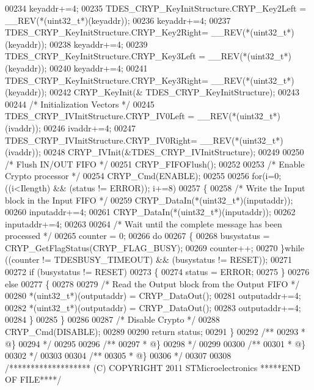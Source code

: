 \begin{DoxyCode}
00234   keyaddr+=4;
00235   TDES\_CRYP\_KeyInitStructure.CRYP\_Key2Left = \_\_REV(*(uint32\_t*)(keyaddr));
00236   keyaddr+=4;
00237   TDES\_CRYP\_KeyInitStructure.CRYP\_Key2Right= \_\_REV(*(uint32\_t*)(keyaddr));
00238   keyaddr+=4;
00239   TDES\_CRYP\_KeyInitStructure.CRYP\_Key3Left = \_\_REV(*(uint32\_t*)(keyaddr));
00240   keyaddr+=4;
00241   TDES\_CRYP\_KeyInitStructure.CRYP\_Key3Right= \_\_REV(*(uint32\_t*)(keyaddr));
00242   CRYP_KeyInit(& TDES\_CRYP\_KeyInitStructure);
00243 
00244   \textcolor{comment}{/* Initialization Vectors */}
00245   TDES\_CRYP\_IVInitStructure.CRYP\_IV0Left = \_\_REV(*(uint32\_t*)(ivaddr));
00246   ivaddr+=4;
00247   TDES\_CRYP\_IVInitStructure.CRYP\_IV0Right= \_\_REV(*(uint32\_t*)(ivaddr));
00248   CRYP_IVInit(&TDES\_CRYP\_IVInitStructure);
00249 
00250   \textcolor{comment}{/* Flush IN/OUT FIFO */}
00251   CRYP_FIFOFlush();
00252 
00253   \textcolor{comment}{/* Enable Crypto processor */}
00254   CRYP_Cmd(ENABLE);
00255 
00256   \textcolor{keywordflow}{for}(i=0; ((i<Ilength) && (status != ERROR)); i+=8)
00257   \{
00258     \textcolor{comment}{/* Write the Input block in the Input FIFO */}
00259     CRYP\_DataIn(*(uint32\_t*)(inputaddr));
00260     inputaddr+=4;
00261     CRYP\_DataIn(*(uint32\_t*)(inputaddr));
00262     inputaddr+=4;
00263 
00264     \textcolor{comment}{/* Wait until the complete message has been processed */}
00265     counter = 0;
00266     \textcolor{keywordflow}{do}
00267     \{
00268       busystatus = CRYP\_GetFlagStatus(CRYP_FLAG_BUSY);
00269       counter++;
00270     \}\textcolor{keywordflow}{while} ((counter != TDESBUSY_TIMEOUT) && (busystatus != RESET));
00271 
00272     \textcolor{keywordflow}{if} (busystatus != RESET)
00273    \{
00274        status = ERROR;
00275     \}
00276     \textcolor{keywordflow}{else}
00277     \{
00278 
00279       \textcolor{comment}{/* Read the Output block from the Output FIFO */}
00280       *(uint32\_t*)(outputaddr) = CRYP\_DataOut();
00281       outputaddr+=4;
00282       *(uint32\_t*)(outputaddr) = CRYP\_DataOut();
00283       outputaddr+=4;
00284     \}
00285   \}
00286 
00287   \textcolor{comment}{/* Disable Crypto */}
00288   CRYP_Cmd(DISABLE);
00289 
00290   \textcolor{keywordflow}{return} status;
00291 \}
00292 \textcolor{comment}{/**}
00293 \textcolor{comment}{  * @\}}
00294 \textcolor{comment}{  */}
00295 
00296 \textcolor{comment}{/**}
00297 \textcolor{comment}{  * @\}}
00298 \textcolor{comment}{  */}
00299 
00300 \textcolor{comment}{/**}
00301 \textcolor{comment}{  * @\}}
00302 \textcolor{comment}{  */}
00303 
00304 \textcolor{comment}{/**}
00305 \textcolor{comment}{  * @\}}
00306 \textcolor{comment}{  */}
00307 
00308 \textcolor{comment}{/******************* (C) COPYRIGHT 2011 STMicroelectronics *****END OF FILE****/}
\end{DoxyCode}
